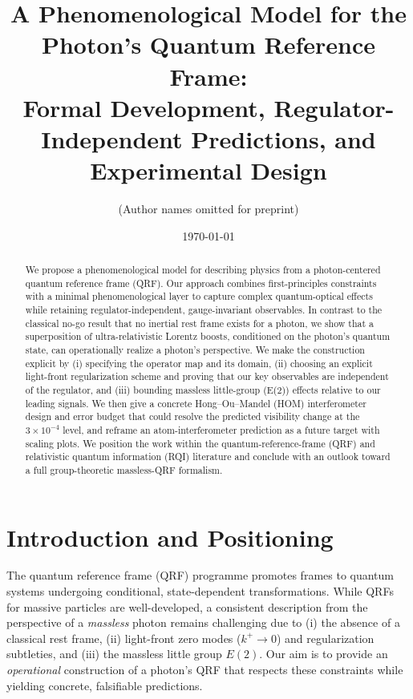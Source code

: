 \documentclass[aps,11pt]{article}
\newcommand{\kplus}{k^{+}}
\begin{document}
\title{A Phenomenological Model for the Photon's Quantum Reference Frame:\\
Formal Development, Regulator-Independent Predictions, and Experimental Design}

\author{(Author names omitted for preprint)}
\date{\today}
\maketitle

\begin{abstract}
We propose a phenomenological model for describing physics from a photon-centered quantum reference frame (QRF). Our approach combines first-principles constraints with a minimal phenomenological layer to capture complex quantum-optical effects while retaining regulator-independent, gauge-invariant observables. In contrast to the classical no-go result that no inertial rest frame exists for a photon, we show that a superposition of ultra-relativistic Lorentz boosts, conditioned on the photon's quantum state, can operationally realize a photon's perspective. We make the construction explicit by (i) specifying the operator map and its domain, (ii) choosing an explicit light-front regularization scheme and proving that our key observables are independent of the regulator, and (iii) bounding massless little-group (E(2)) effects relative to our leading signals. We then give a concrete Hong--Ou--Mandel (HOM) interferometer design and error budget that could resolve the predicted visibility change at the $3\times 10^{-4}$ level, and reframe an atom-interferometer prediction as a future target with scaling plots. We position the work within the quantum-reference-frame (QRF) and relativistic quantum information (RQI) literature and conclude with an outlook toward a full group-theoretic massless-QRF formalism.
\end{abstract}

\section{Introduction and Positioning}\label{sec:intro}
The quantum reference frame (QRF) programme promotes frames to quantum systems undergoing conditional, state-dependent transformations. While QRFs for massive particles are well-developed, a consistent description from the perspective of a \emph{massless} photon remains challenging due to (i) the absence of a classical rest frame, (ii) light-front zero modes (\(\kplus\!\to0\)) and regularization subtleties, and (iii) the massless little group \(E(2)\). Our aim is to provide an \emph{operational} construction of a photon's QRF that respects these constraints while yielding concrete, falsifiable predictions.
\end{document}
